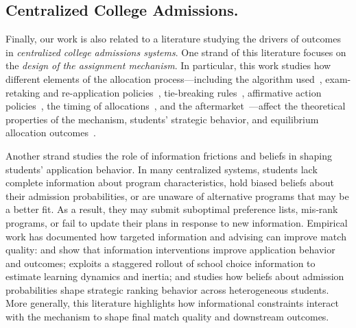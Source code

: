 \subsection{Centralized College Admissions.}
Finally, our work is also related to a literature studying the drivers of outcomes in \emph{centralized college admissions systems}. 
One strand of this literature focuses on the \emph{design of the assignment mechanism}. In particular, this work studies how different elements of the allocation process---including the algorithm used~\citep{Calsamiglia2020}, exam-retaking and re-application policies~\citep{larroucau2025, rios2026}, tie-breaking rules~\citep{abdulkadiroglu2009, Arnosti2015, Ashlagi2019}, affirmative action policies~\citep{rios2021improving,Baswana2019,otero23}, the timing of allocations~\citep{Luflade2017, GongLiang2022}, and the aftermarket~\citep{Kapor2024}---affect the theoretical properties of the mechanism, students' strategic behavior, and equilibrium allocation outcomes~\citep{chenkoesten2013,fu2014,neilson2021}. 

Another strand studies the role of information frictions and beliefs in shaping students’ application behavior. In many centralized systems, students lack complete information about program characteristics, hold biased beliefs about their admission probabilities, or are unaware of alternative programs that may be a better fit. As a result, they may submit suboptimal preference lists, mis‑rank programs, or fail to update their plans in response to new information. Empirical work has documented how targeted information and advising can improve match quality: \citet{hastings2008} and \citet{agarwal2018} show that information interventions improve application behavior and outcomes; \citet{Narita2019} exploits a staggered rollout of school choice information to estimate learning dynamics and inertia; and \citet{larroucau2024} studies how beliefs about admission probabilities shape strategic ranking behavior across heterogeneous students. More generally, this literature highlights how informational constraints interact with the mechanism to shape final match quality and downstream outcomes.

